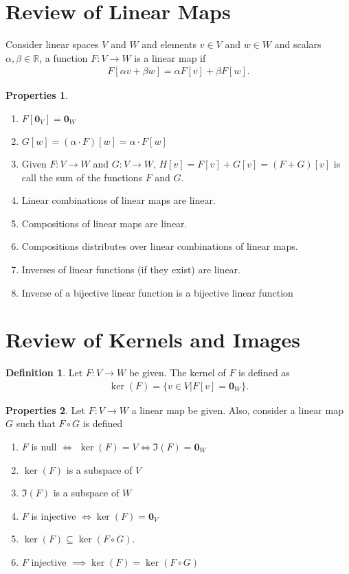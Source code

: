 \documentclass{book}
\theoremstyle{definition}
\newtheorem{defn}{Definition}[section]
\newtheorem{prop}{Properties}[section]
\newcommand{\R}{\mathbb{R}}
\begin{document}
\section{Review of Linear Maps}
Consider linear spaces $V$ and $W$ and elements $v \in V$ and $w \in W$ and scalars $\alpha, \beta \in \R$, a function $F : V \rightarrow W$ is a linear map if
\begin{align*}
F[\alpha v + \beta w] = \alpha F[v] + \beta F[w].
\end{align*}
\begin{prop}
	$\,$
\begin{enumerate}
	\item $F[\mathbf{0}_V] = \mathbf{0}_W$
	\item $G[w] = (\alpha \cdot F)[w] = \alpha\cdot F[w]$
	\item Given $F : V \rightarrow W$ and $G : V \rightarrow W$, $H[v] = F[v] + G[v] = (F+G)[v]$ is call the sum of the functions $F$ and $G$.
	\item Linear combinations of linear maps are linear.
	\item Compositions of linear maps are linear. 
	\item Compositions distributes over linear combinations of linear maps.
	\item Inverses of linear functions (if they exist) are linear.
	\item Inverse of a bijective linear function is a bijective linear function
\end{enumerate}
\end{prop}
\section{Review of Kernels and Images}
\begin{defn}
	Let $F : V \rightarrow W$ be given. The kernel of $F$ is defined as
	\begin{align*}
	\ker(F) = \{v\in V \vert F[v] = \mathbf{0}_W\}.
	\end{align*}
\end{defn}
\begin{prop}
	Let $F : V \rightarrow W$ a linear map be given. Also, consider a linear map $G$ such that $F\circ G$ is defined 
	\begin{enumerate}
		\item $F$ is null $\iff$ $\ker(F) = V \iff \Im(F) = \mathbf{0}_W $
		\item $\ker(F)$ is a subspace of $V$
		\item $\Im(F)$ is a subspace of $W$
		\item $F$ is injective $\iff \ker(F) = \mathbf{0}_V$
		\item $\ker(F) \subseteq \ker(F\circ G)$.
		\item $F$ injective $\implies \ker(F) = \ker(F\circ G)$
	\end{enumerate}
\end{prop}
\end{document}
